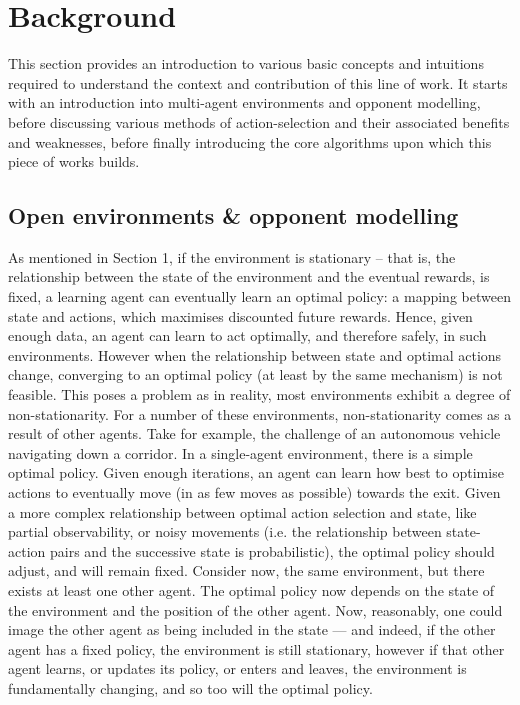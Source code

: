 \section{Background}\label{Background}
This section provides an introduction to various basic concepts and intuitions required to understand the context and contribution of this line of work. It starts with an introduction into multi-agent environments and opponent modelling, before discussing various methods of action-selection and their associated benefits and weaknesses, before finally introducing the core algorithms upon which this piece of works builds. 

\subsection{Open environments \& opponent modelling}
As mentioned in Section 1, if the environment is stationary -- that is, the relationship between the state of the environment and the eventual rewards, is fixed, a learning agent can eventually learn an optimal policy: a mapping between state and actions, which maximises discounted future rewards. 
Hence, given enough data, an agent can learn to act optimally, and therefore safely, in such environments. However when the relationship between state and optimal actions change, converging to an optimal policy (at least by the same mechanism) is not feasible. This poses a problem as in reality, most environments exhibit a degree of non-stationarity. For a number of these environments, non-stationarity comes as a result of other agents. Take for example, the challenge of an autonomous vehicle navigating down a corridor. 
\newline \newline
In a single-agent environment, there is a simple optimal policy. Given enough iterations, an agent can learn how best to optimise actions to eventually move (in as few moves as possible) towards the exit. 
\newline \newline
Given a more complex relationship between optimal action selection and state, like partial observability, or noisy movements (i.e. the relationship between state-action pairs and the successive state is probabilistic), the optimal policy should adjust, and will remain fixed. 
\newline \newline
Consider now, the same environment, but there exists at least one other agent. The optimal policy now depends on the state of the environment and the position of the other agent. Now, reasonably, one could image the other agent as being included in the state --- and indeed, if the other agent has a fixed policy, the environment is still stationary, however if that other agent learns, or updates its policy, or enters and leaves, the environment is fundamentally changing, and so too will the optimal policy.
